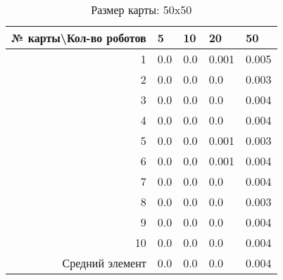 \begin{table}[H]
\centering
\begin{tabular}{|r|l|l|l|l|}
\hline
№ карты\textbackslash Кол-во роботов & \textbf{5} & \textbf{10} & \textbf{20} & \textbf{50}\\ \hline
1 & 0.0 & 0.0 & 0.001 & 0.005\\ \hline
2 & 0.0 & 0.0 & 0.0 & 0.003\\ \hline
3 & 0.0 & 0.0 & 0.0 & 0.004\\ \hline
4 & 0.0 & 0.0 & 0.0 & 0.004\\ \hline
5 & 0.0 & 0.0 & 0.001 & 0.003\\ \hline
6 & 0.0 & 0.0 & 0.001 & 0.004\\ \hline
7 & 0.0 & 0.0 & 0.0 & 0.004\\ \hline
8 & 0.0 & 0.0 & 0.0 & 0.003\\ \hline
9 & 0.0 & 0.0 & 0.0 & 0.004\\ \hline
10 & 0.0 & 0.0 & 0.0 & 0.004\\ \hline
Средний элемент & 0.0 & 0.0 & 0.0 & 0.004\\ \hline
\end{tabular}
\caption*{Размер карты: 50x50}
\end{table}
